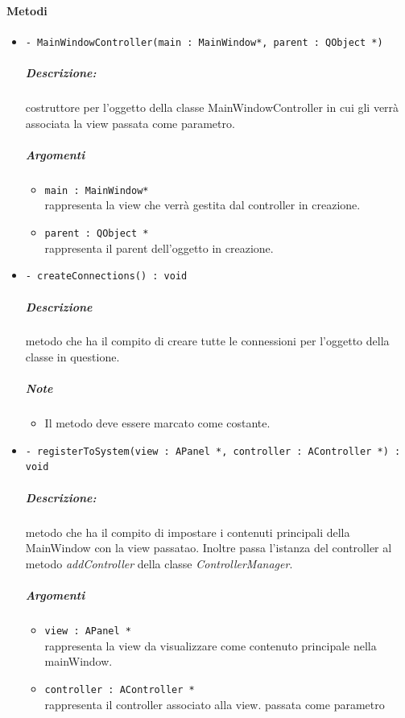 	\paragraph{\color{black}Metodi}
		\begin{itemize}
			\item \color{blue} \verb!- MainWindowController(main : MainWindow*, parent : QObject *)!
			\color{black}
			\subparagraph{Descrizione:} costruttore per l'oggetto della classe MainWindowController in cui gli verrà associata la view passata come parametro.
			\color{black}
			\subparagraph{Argomenti}
			\begin{itemize}
				\item \color{RoyalPurple} \verb!main : MainWindow*!\\				
\color{black} rappresenta la view che verrà gestita dal controller in creazione.
				\item \color{RoyalPurple} \verb!parent : QObject *!\\				
\color{black} rappresenta il parent dell'oggetto in creazione.
			\end{itemize}
			\item \color{blue} \verb!- createConnections() : void!
			\color{black}
			\subparagraph{Descrizione} metodo che ha il compito di creare tutte le connessioni per l'oggetto della classe in questione.
			\subparagraph{Note}
			\begin{itemize}
				\item Il metodo deve essere marcato come costante.
			\end{itemize}
			\item \color{blue} \verb!- registerToSystem(view : APanel *, controller : AController *) : void!
			\color{black}
			\subparagraph{Descrizione:} metodo che ha il compito di impostare i contenuti principali della MainWindow  con la view passatao. Inoltre passa l'istanza del controller al metodo \textit{addController} della classe \textit{ControllerManager}.
			\color{black}
			\subparagraph{Argomenti}
			\begin{itemize}
				\item \color{RoyalPurple} \verb!view : APanel *!\\				
\color{black} rappresenta la view da visualizzare come contenuto principale nella mainWindow.
				\item \color{RoyalPurple} \verb!controller : AController *!\\				
\color{black} rappresenta il controller associato alla view. passata come parametro
			\end{itemize}

\end{itemize}
